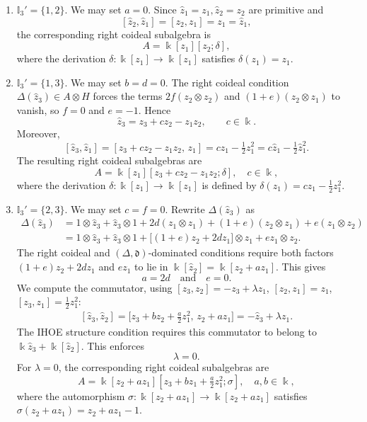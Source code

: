 \documentclass{article}
\theoremstyle{plain}
\theoremstyle{definition}
\numberwithin{equation}{section}
\newcommand{\II}{\mathbb{I}}
\newcommand{\dd}{\mathfrak{d}}
\begin{document}
	\begin{enumerate}
		\item $\II_{3}'=\{1,2\}$. We may set $a=0$. Since $\hat z_{1} =z_{1}, \hat z_{2} =z_{2}$ are primitive and
		\[
		[\hat z_{2},\hat z_{1}]=[z_{2},z_{1}]=z_{1}=\hat z_{1},
		\]
		the corresponding right coideal subalgebra is
		\[
		A=\Bbbk[z_{1}][z_{2};\delta],
		\]
		where the derivation $\delta\colon \Bbbk[z_{1}] \to \Bbbk[z_{1}]$ satisfies $\delta(z_{1})=z_{1}$.
		
		\item $\II_{3}'=\{1,3\}$. We may set $b=d=0$.
		The right coideal condition $\Delta(\hat z_{3})\in A\otimes H$ forces
		the terms $2f(z_{2}\otimes z_{2})$ and $(1+e)(z_{2}\otimes z_{1})$ to vanish,
		so $f=0$ and $e=-1$. Hence
		\[
		\hat z_{3} = z_{3}  + cz_{2} - z_{1} z_{2},\qquad c\in\Bbbk.
		\]
		Moreover,
		\[
		[\hat z_{3},\hat z_{1}] = [z_{3}  + cz_{2}  - z_{1}z_{2},\,z_{1}]
		= c z_{1} - \tfrac12 z_{1}^{2} = c \hat z_{1} - \tfrac12 \hat z_{1}^{2}.
		\]
		The resulting right coideal subalgebras are
		\[
		A = \Bbbk[z_{1}][z_{3}+cz_{2}-z_{1}z_{2};\delta], \quad c\in \Bbbk,
		\]
		where the derivation $\delta\colon \Bbbk[z_{1}]\to \Bbbk[z_{1}]$ is defined by $\delta(z_{1})=c z_{1}-\frac12 z_{1}^{2}$.
		
		\item $\II_{3}'=\{2,3\}$. We may set $c=f=0$.
		Rewrite $\Delta(\hat z_{3})$ as
		\[
		\begin{aligned}
			\Delta(\hat z_{3})
			&= 1\otimes\hat z_{3} + \hat z_{3}\otimes1
			+ 2d(z_{1}\otimes z_{1})
			+ (1+e)(z_{2}\otimes z_{1}) + e(z_{1}\otimes z_{2})\\
			&= 1\otimes\hat z_{3} + \hat z_{3}\otimes1
			+ \bigl[(1+e)z_{2}+2d z_{1}\bigr]\otimes z_{1}
			+ e z_{1}\otimes z_{2}.
		\end{aligned}
		\]
		The right coideal and $(\Delta,\dd)$-dominated conditions require both factors
		$(1+e)z_{2}+2d z_{1}$ and $e z_{1}$ to lie in
		$\Bbbk[\hat z_{2}]=\Bbbk[z_{2}+a z_{1}]$. This gives
		\[
		a=2d \quad \text{and}\quad e = 0.
		\]
		We compute the commutator, using $[z_{3},z_{2}]= -z_{3}+\lambda z_{1}$, $[z_{2},z_{1}]=z_{1}$,
		$[z_{3},z_{1}]=\frac12 z_{1}^{2}$:
		\[
		\begin{aligned}
			[\hat z_{3},\hat z_{2}]
			= \bigl[z_{3}+ bz_{2} +\tfrac{a}{2} z_{1}^{2},\,z_{2}+a z_{1}\bigr] = -\hat z_{3} + \lambda z_{1}.
		\end{aligned}
		\]
		The IHOE structure condition requires this commutator to belong to $\Bbbk \hat z_{3}+\Bbbk[\hat z_{2}]$. This enforces
		\[
		\lambda =0.
		\]
		For $\lambda=0$, the corresponding right coideal subalgebras are
		\[
		A = \Bbbk[z_{2}+ az_{1}][z_{3} + b z_{1} +\tfrac{a}{2} z_{1}^{2}; \sigma], \quad a,b\in \Bbbk,
		\]
		where the automorphism $\sigma\colon \Bbbk[z_{2}+ az_{1}]\to  \Bbbk[z_{2}+ az_{1}]$ satisfies $\sigma(z_{2}+ az_{1}) = z_{2}+ az_{1}-1$.
	\end{enumerate}
	
\end{document}
